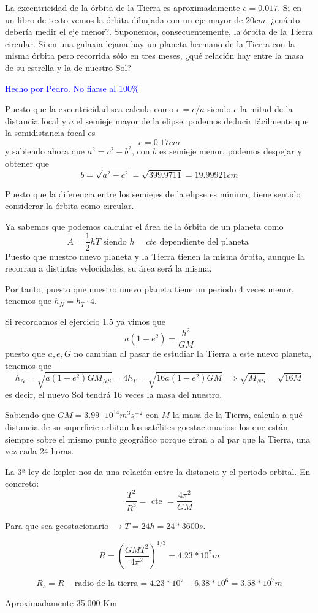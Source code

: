 \begin{problem}[8]
La excentricidad de la órbita de la Tierra es aproximadamente $e=0.017$. Si en un libro de texto vemos la órbita dibujada con un eje mayor de $20cm$, ¿cuánto debería medir el eje menor?. Suponemos, consecuentemente, la órbita de la Tierra circular. Si en una galaxia lejana hay un planeta hermano de la Tierra con la misma órbita pero recorrida sólo en tres meses, ¿qué relación hay entre la masa de su estrella y la de nuestro Sol?

\solution
\textcolor{blue}{Hecho por Pedro. No fiarse al 100\%}

Puesto que la excentricidad sea calcula como $e=c/a$ siendo $c$ la mitad de la distancia focal y $a$ el semieje mayor de la elipse, podemos deducir fácilmente que la semidistancia focal es
\[c= 0.17cm\]
y sabiendo ahora que $a^2 = c^2+b^2$, con $b$ es semieje menor, podemos despejar y obtener que
\[b = \sqrt{a^2-c^2}=\sqrt{399.9711} = 19.99921 cm\]

Puesto que la diferencia entre los semiejes de la elipse es mínima, tiene sentido considerar la órbita como circular.

Ya sabemos que podemos calcular el área de la órbita de un planeta como
\[A = \frac{1}{2}h T \text{ siendo } h = cte \text{ dependiente del planeta }\]
Puesto que nuestro nuevo planeta y la Tierra tienen la misma órbita, aunque la recorran a distintas velocidades, su área será la misma.

Por tanto, puesto que nuestro nuevo planeta tiene un período 4 veces menor, tenemos que $h_N=h_T \cdot 4$.

Si recordamos el ejercicio 1.5 ya vimos que
\[a(1-e^2)=\frac{h^2}{GM}\]
puesto que $a,e,G$ no cambian al pasar de estudiar la Tierra a este nuevo planeta, tenemos que
\[h_N=\sqrt{a(1-e^2)GM_{NS}}=4h_T=\sqrt{16a(1-e^2)GM} \implies \sqrt{M_{NS}}=\sqrt{16M}\]
es decir, el nuevo Sol tendrá 16 veces la masa del nuestro.

\end{problem}

\begin{problem}[9]
Sabiendo que $GM=3.99\cdot 10^{14}m^3s^{-2}$ con $M$ la masa de la Tierra, calcula a qué distancia de su superficie orbitan los satélites goestacionarios: los que están siempre sobre el mismo punto geográfico porque giran a al par que la Tierra, una vez cada 24 horas.
\solution

La 3ª ley de kepler nos da una relación entre la distancia y el periodo orbital. En concreto:
\[\frac{T^2}{R^3} = \text{ cte } = \frac{4\pi^2}{GM} \]

Para que sea geostacionario $\rightarrow T = 24h = 24 * 3600 s$.

$$ R = \left( \frac{GMT^2}{4\pi^2} \right)^{1/3} = 4.23 * 10^7 m $$

$$ R_{s} = R - \text{radio de la tierra} = 4.23 * 10^{7} - 6.38 * 10^{6} = 3.58 * 10^{7} m $$

Aproximadamente 35.000 Km


\end{problem}

